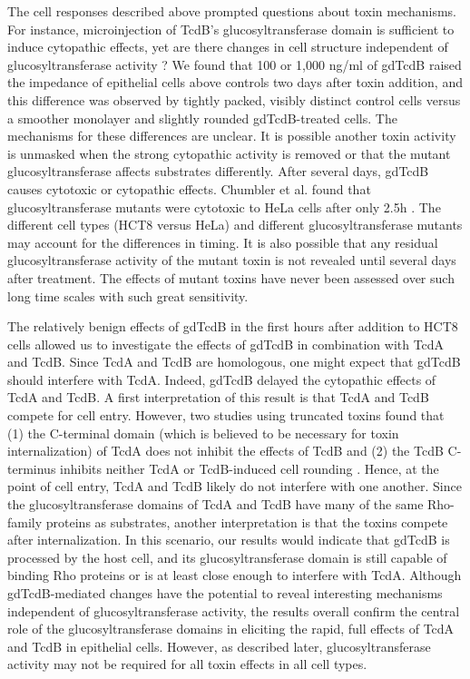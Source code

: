 The cell responses described above prompted questions about 
toxin mechanisms. For instance, microinjection of TcdB's 
glucosyltransferase domain is sufficient to induce 
cytopathic effects, yet are there changes in cell structure 
independent of glucosyltransferase activity \cite{Rupnik:2005dq}? We found 
that 100 or 1,000 ng/ml of gdTcdB raised the impedance of 
epithelial cells above controls two days after toxin 
addition, and this difference was observed by tightly 
packed, visibly distinct control cells versus a smoother 
monolayer and slightly rounded gdTcdB-treated cells. The 
mechanisms for these differences are unclear. It is possible 
another toxin activity is unmasked when the strong 
cytopathic activity is removed or that the mutant 
glucosyltransferase affects substrates differently. After 
several days, gdTcdB causes cytotoxic or cytopathic effects. 
Chumbler et al. found that glucosyltransferase mutants were 
cytotoxic to HeLa cells after only 2.5h \cite{Chumbler:2012co}. The different 
cell types (HCT8 versus HeLa) and different glucosyltransferase 
mutants may account for the differences in timing. It 
is also possible that any residual glucosyltransferase 
activity of the mutant toxin is not revealed until 
several days after treatment. The effects of mutant 
toxins have never been assessed over such long time 
scales with such great sensitivity.

The relatively benign effects of gdTcdB in the first 
hours after addition to HCT8 cells allowed us to 
investigate the effects of gdTcdB in combination with 
TcdA and TcdB. Since TcdA and TcdB are homologous, one 
might expect that gdTcdB should interfere with TcdA. 
Indeed, gdTcdB delayed the cytopathic effects of TcdA 
and TcdB. A first interpretation of this result is 
that TcdA and TcdB compete for cell entry. However, 
two studies using truncated toxins found that (1) 
the C-terminal domain (which is believed to be 
necessary for toxin internalization) of TcdA does 
not inhibit the effects of TcdB and (2) the TcdB 
C-terminus inhibits neither TcdA or TcdB-induced 
cell rounding \cite{Frisch:2003jo,Dingle:2008gu}. Hence, at the point of cell 
entry, TcdA and TcdB likely do not interfere with one 
another. Since the glucosyltransferase domains of TcdA 
and TcdB have many of the same Rho-family proteins as 
substrates, another interpretation is that the toxins 
compete after internalization. In this scenario, our 
results would indicate that gdTcdB is processed by 
the host cell, and its glucosyltransferase domain is 
still capable of binding Rho proteins or is at least 
close enough to interfere with TcdA. Although 
gdTcdB-mediated changes have the potential to reveal 
interesting mechanisms independent of glucosyltransferase 
activity, the results overall confirm the central 
role of the glucosyltransferase domains in eliciting 
the rapid, full effects of TcdA and TcdB in epithelial 
cells. However, as described later, glucosyltransferase 
activity may not be required for all toxin effects in 
all cell types.

